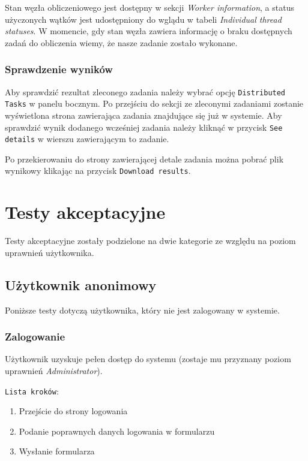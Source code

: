 \documentclass[a4paper,11pt,twoside]{report}
\theoremstyle{definition}
\begin{document}
		
		Stan węzła obliczeniowego jest dostępny w sekcji \textit{Worker information}, a status użyczonych wątków jest udostępniony do wglądu w tabeli \textit{Individual thread statuses}. W momencie, gdy stan węzła zawiera informację o braku dostępnych zadań do obliczenia wiemy, że nasze zadanie zostało wykonane.
		
		
		\subsubsection{Sprawdzenie wyników}
		
		Aby sprawdzić rezultat zleconego zadania należy wybrać opcję \texttt{Distributed Tasks} w panelu bocznym. Po przejściu do sekcji ze zleconymi zadaniami zostanie wyświetlona strona zawierająca zadania znajdujące się już w systemie. Aby sprawdzić wynik dodanego wcześniej zadania należy kliknąć w przycisk \texttt{See details} w wierszu zawierającym to zadanie.
		
		
		Po przekierowaniu do strony zawierającej detale zadania można pobrać plik wynikowy klikając na przycisk \texttt{Download results}.

    
    \section{Testy akceptacyjne}
    	
    	Testy akceptacyjne zostały podzielone na dwie kategorie ze względu na poziom uprawnień użytkownika.
    	
    	\subsection{Użytkownik anonimowy}
    		Poniższe testy dotyczą użytkownika, który nie jest zalogowany w systemie.
    	
    	
    		\subsubsection{Zalogowanie}	
    			Użytkownik uzyskuje pełen dostęp do systemu (zostaje mu przyznany poziom uprawnień \textit{Administrator}). 
    		
	    		\texttt{Lista kroków}:
	    		\begin{enumerate}
	    			\item Przejście do strony logowania
	    			\item Podanie poprawnych danych logowania w formularzu
	    			\item Wysłanie formularza
	    		\end{enumerate}
	    	
\end{document}
